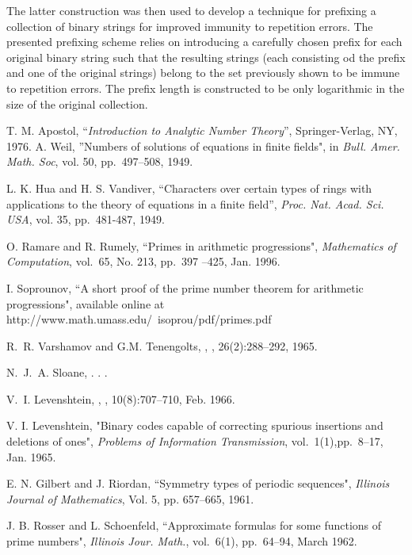 \documentclass[12pt]{article} \pagestyle{plain} \topmargin
\begin{document}
The latter construction was then used to develop a technique for
prefixing a collection of binary strings for improved immunity to
repetition errors. The presented prefixing scheme relies on
introducing a carefully chosen prefix for each original binary
string such that the resulting strings (each consisting od the
prefix and one of the original strings) belong to the set
previously shown to be immune to repetition errors. The prefix
length is constructed to be only logarithmic in the size of the
original collection.

\begin{thebibliography}{10}
 T. M. Apostol, ``\emph{Introduction to Analytic Number
Theory}'', Springer-Verlag, NY, 1976.
A. Weil, ''Numbers of solutions of equations in finite fields", in
\emph{Bull. Amer. Math. Soc}, vol. 50, pp.~497--508, 1949.

L. K. Hua and H. S. Vandiver, ``Characters over certain types of
rings with applications to the theory of equations in a finite
field'', \emph{Proc. Nat. Acad. Sci. USA}, vol. 35, pp.~481-487,
1949.

O. Ramare and R. Rumely, ``Primes in arithmetic progressions",
\emph{Mathematics of Computation}, vol.\ 65, No. 213, pp.~397
--425, Jan. 1996.

I. Soprounov, ``A short proof of the prime number theorem for
arithmetic progressions", available online at
http://www.math.umass.edu/~isoprou/pdf/primes.pdf

R.~R. Varshamov and G.M. Tenengolts,
,
, 26(2):288--292, 1965.

N.~J.~A. Sloane,
.
.
.


V.~I. Levenshtein,
,
, 10(8):707--710, Feb. 1966.


V. I. Levenshtein, "Binary codes capable of correcting spurious
insertions and deletions of ones", \emph{Problems of Information
Transmission}, vol.\ 1(1),pp.~8--17, Jan. 1965.

E. N. Gilbert and J. Riordan, ``Symmetry types of periodic
sequences", \emph{Illinois Journal of Mathematics}, Vol. 5, pp.
657--665, 1961.

J. B. Rosser and L. Schoenfeld, ``Approximate formulas for some
functions of prime numbers", \emph{Illinois Jour. Math.}, vol.\
6(1), pp.~64--94, March 1962.
\end{thebibliography}
\end{document}
